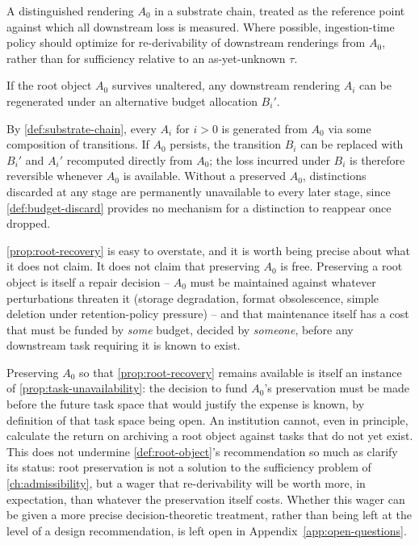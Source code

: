\begin{definition}
\label{def:root-object}
A distinguished rendering $A_0$ in a substrate chain, treated as the
reference point against which all downstream loss is measured. Where
possible, ingestion-time policy should optimize for re-derivability of
downstream renderings from $A_0$, rather than for sufficiency relative to
an as-yet-unknown $\tau$.
\end{definition}

\begin{proposition}
\label{prop:root-recovery}
If the root object $A_0$ survives unaltered, any downstream rendering
$A_i$ can be regenerated under an alternative budget allocation $B_i'$.
\end{proposition}

\begin{proofsketch}
By \cref{def:substrate-chain}, every $A_i$ for $i>0$ is generated from
$A_0$ via some composition of transitions. If $A_0$ persists, the
transition $B_i$ can be replaced with $B_i'$ and $A_i'$ recomputed
directly from $A_0$; the loss incurred under $B_i$ is therefore reversible
whenever $A_0$ is available. Without a preserved $A_0$, distinctions
discarded at any stage are permanently unavailable to every later stage,
since \cref{def:budget-discard} provides no mechanism for a distinction to
reappear once dropped.
\end{proofsketch}

\cref{prop:root-recovery} is easy to overstate, and it is worth being
precise about what it does not claim. It does not claim that preserving
$A_0$ is free. Preserving a root object is itself a repair decision --
$A_0$ must be maintained against whatever perturbations threaten it
(storage degradation, format obsolescence, simple deletion under
retention-policy pressure) -- and that maintenance itself has a cost that
must be funded by \emph{some} budget, decided by \emph{someone}, before any
downstream task requiring it is known to exist.

\begin{remark}
\label{rem:root-bootstrap}
Preserving $A_0$ so that \cref{prop:root-recovery} remains available is
itself an instance of \cref{prop:task-unavailability}: the decision to fund
$A_0$'s preservation must be made before the future task space that would
justify the expense is known, by definition of that task space being open.
An institution cannot, even in principle, calculate the return on
archiving a root object against tasks that do not yet exist. This does not
undermine \cref{def:root-object}'s recommendation so much as clarify its
status: root preservation is not a solution to the sufficiency problem of
\cref{ch:admissibility}, but a wager that re-derivability will be worth
more, in expectation, than whatever the preservation itself costs. Whether
this wager can be given a more precise decision-theoretic treatment,
rather than being left at the level of a design recommendation, is left
open in Appendix~\ref{app:open-questions}.
\end{remark}

